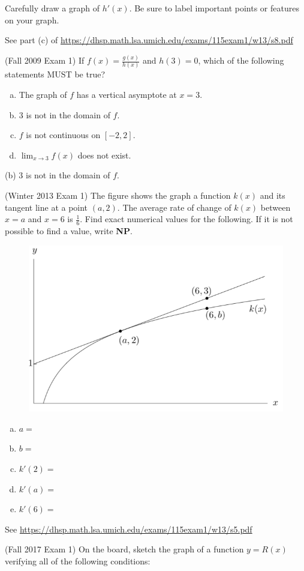 \documentclass[11pt]{exam}
\begin{document}
\begin{questions}
Carefully draw a graph of $h'(x)$. Be sure to label important points or features on your graph.
\begin{solution}
  See part (c)  of \href{https://dhsp.math.lsa.umich.edu/exams/115exam1/w13/s8.pdf}{https://dhsp.math.lsa.umich.edu/exams/115exam1/w13/s8.pdf}
\end{solution}
\pagebreak
\question (Fall 2009 Exam 1)  If $f(x) = \frac{g(x)}{h(x)}$ and $h(3)=0$, which of the following statements MUST be true?
\begin{enumerate}[(a)]
\item The graph of $f$ has a vertical asymptote at $x=3$.
\item $3$ is not in the domain of $f$.
\item $f$ is not continuous on $[-2,2]$.
\item $\displaystyle\lim_{x \rightarrow 3} f(x)$ does not exist.
\end{enumerate}
\begin{solution}
 (b) \(3\) is not in the domain of \(f\).
\end{solution}
\question (Winter 2013 Exam 1) The figure shows the graph a function $k(x)$ and its tangent line at a point $(a, 2)$. The average rate of change of $k(x)$ between $x = a$ and $x = 6$ is $\frac{1}{6}$.
Find exact numerical values for the following. If it is not possible to find a value, write {\bf NP}.
\begin{figure}[h]
\includegraphics[scale=0.5]{graphk}
\end{figure}
\begin{multicols}{3}
\begin{enumerate}[(a)]
\item $a =$
\item $b = $
\item $k'(2)=$
\item $k'(a)=$
\item $k'(6)=$
\end{enumerate}
\end{multicols}
\begin{solution}
 See \href{https://dhsp.math.lsa.umich.edu/exams/115exam1/w13/s5.pdf}{https://dhsp.math.lsa.umich.edu/exams/115exam1/w13/s5.pdf}
\end{solution}
\question (Fall 2017 Exam 1) On the board, sketch the graph of a function $y = R(x)$ verifying all of the following conditions:


\end{questions}
\end{document}
